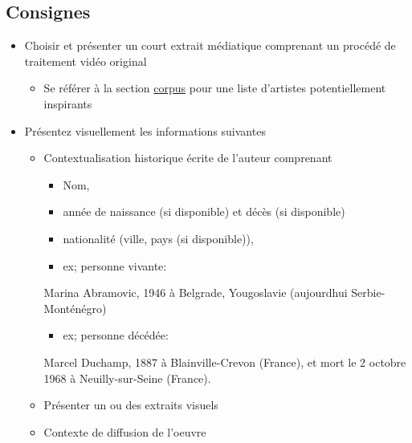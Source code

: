 \documentclass[
  french,
]{book}
\newenvironment{Shaded}{\begin{snugshade}}{\end{snugshade}}
\newcommand{\NormalTok}[1]{#1}
\providecommand{\tightlist}{%
  \setlength{\itemsep}{0pt}\setlength{\parskip}{0pt}}
\begin{document}
\hypertarget{consignes}{%
\subsection{Consignes}\label{consignes}}

\begin{itemize}
\tightlist
\item
  Choisir et présenter un court extrait médiatique comprenant un procédé de traitement vidéo original

  \begin{itemize}
  \tightlist
  \item
    Se référer à la section \protect\hyperlink{corpus}{corpus} pour une liste d'artistes potentiellement inspirants
  \end{itemize}
\item
  Présentez visuellement les informations suivantes

  \begin{itemize}
  \tightlist
  \item
    Contextualisation historique écrite de l'auteur comprenant

    \begin{itemize}
    \tightlist
    \item
      Nom,
    \item
      année de naissance (si disponible) et décès (si disponible)
    \item
      nationalité (ville, pays (si disponible)),
    \item
      ex; personne vivante:
    \end{itemize}

\begin{Shaded}
\begin{Highlighting}[]
\NormalTok{Marina Abramovic, 1946 à Belgrade, Yougoslavie (aujourd\textquotesingle{}hui Serbie{-}Monténégro)}
\end{Highlighting}
\end{Shaded}

    \begin{itemize}
    \tightlist
    \item
      ex; personne décédée:
    \end{itemize}

\begin{Shaded}
\begin{Highlighting}[]
\NormalTok{Marcel Duchamp, 1887 à Blainville{-}Crevon (France), et mort le 2 octobre 1968 à Neuilly{-}sur{-}Seine (France).}
\end{Highlighting}
\end{Shaded}
  \item
    Présenter un ou des extraits visuels
  \item
    Contexte de diffusion de l'oeuvre


\end{itemize}
\end{itemize}
\end{document}
